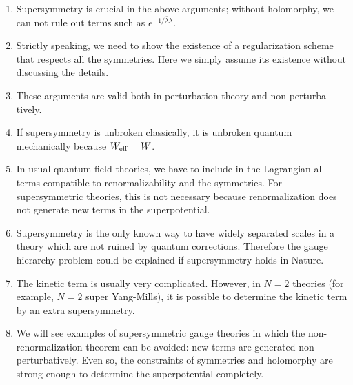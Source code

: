 \documentclass[lecture]{qft-l}
\newcommand{\lam}{\lambda}
\newcommand{\e}[1]{e^{{#1}}}
\newcommand{\eff}{_{{\rm eff}}}
\numberwithin{figure}{chapter}
\begin{document}
\medskip
\begin{enumerate}
\item
Supersymmetry is crucial in the above arguments;
without holomorphy, we can not rule out terms such as 
$\e{-1/{\bar{\lam}\lam}}$.

\smallskip
\item 
Strictly speaking, we need 
to show the existence of a regularization scheme
that respects all the symmetries.
Here we simply assume its existence without discussing the details.

\smallskip
\item 
These arguments are valid both in perturbation theory and 
non-perturba-\break
tively.

\smallskip
\item 
If supersymmetry is unbroken classically, 
it is unbroken quantum mechanically because $W\eff=W$.

\smallskip
\item 
In usual quantum field theories, we have to include in the Lagrangian 
all terms compatible to renormalizability and the symmetries.
For supersymmetric theories, this is not necessary because renormalization
does not generate new terms in the superpotential.

\smallskip
\item 
Supersymmetry is the only known way to have widely separated scales
in a theory which are not ruined by quantum corrections.
Therefore the gauge hierarchy problem could be explained if supersymmetry
holds in Nature.

\smallskip
\item 
The kinetic term is usually very complicated.
However, in $N=2$ theories (for example, $N=2$ super Yang-Mills),
it is possible to determine the kinetic term by an extra 
supersymmetry.

\smallskip
\item 
We will see examples of supersymmetric gauge theories in which the 
non-renormalization theorem can be avoided: new terms are generated 
non-perturbatively.
Even so, the constraints of symmetries and holomorphy are strong enough to
determine the superpotential completely.
\end{enumerate}

\end{document}
